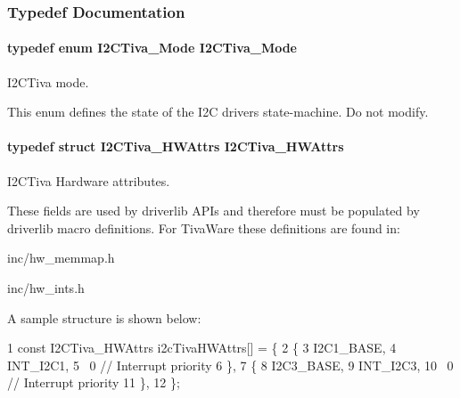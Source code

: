 \subsubsection{Typedef Documentation}
\paragraph[{I2\+C\+Tiva\+\_\+\+Mode}]{\setlength{\rightskip}{0pt plus 5cm}typedef enum {\bf I2\+C\+Tiva\+\_\+\+Mode}  {\bf I2\+C\+Tiva\+\_\+\+Mode}}\label{_i2_c_tiva_8h_ae29c199bdb69bc3c7e6b1bf4ebba76f0}


I2\+C\+Tiva mode. 

This enum defines the state of the I2\+C driver\textquotesingle{}s state-\/machine. Do not modify. 
\paragraph[{I2\+C\+Tiva\+\_\+\+H\+W\+Attrs}]{\setlength{\rightskip}{0pt plus 5cm}typedef struct {\bf I2\+C\+Tiva\+\_\+\+H\+W\+Attrs}  {\bf I2\+C\+Tiva\+\_\+\+H\+W\+Attrs}}\label{_i2_c_tiva_8h_af20903ad2ff3e34d27132e11aef68ad5}


I2\+C\+Tiva Hardware attributes. 

These fields are used by driverlib A\+P\+Is and therefore must be populated by driverlib macro definitions. For Tiva\+Ware these definitions are found in\+:
\begin{DoxyItemize}
\item inc/hw\+\_\+memmap.\+h
\item inc/hw\+\_\+ints.\+h
\end{DoxyItemize}

A sample structure is shown below\+: 
\begin{DoxyCode}
1 const I2CTiva\_HWAttrs i2cTivaHWAttrs[] = \{
2     \{
3         I2C1\_BASE,
4         INT\_I2C1,
5         ~0               // Interrupt priority
6     \},
7     \{
8         I2C3\_BASE,
9         INT\_I2C3,
10         ~0               // Interrupt priority
11     \},
12 \};
\end{DoxyCode}
